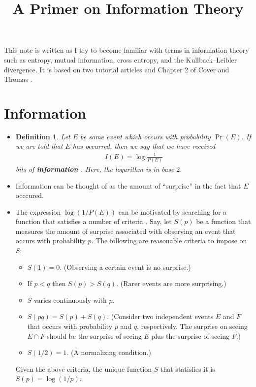 \documentclass[10pt]{article}
\title{A Primer on Information Theory}
\newtheorem{definition}[lemma]{Definition}
\begin{document}
  \maketitle

  This note is written as I try to become familiar with terms in information theory such as entropy, mutual information, cross entropy, and the Kullback--Leibler divergence. It is based on two tutorial articles \cite{Rosenfeld:2018, Galvin:2014} and Chapter 2 of Cover and Thomas \cite{Cover:1991}.

  \section{Information}

  \begin{itemize}
  	\item 
  	\begin{definition}
  	Let $E$ be some event which occurs with probability $\Pr(E)$. If we are told that $E$ has occurred, then we say that we have received
  	\begin{align*}
  		I(E) = \log \frac{1}{P(E)}
  	\end{align*}
  	bits of \textbf{information} \cite{Abramson:1963}. Here, the logarithm is in base $2$.	
  	\end{definition}  

  	\item Information can be thought of as the amount of ``surprise'' in the fact that $E$ occcured.

  	\item The expression $\log (1/P(E))$ can be motivated by searching for a function that satisfies a number of criteria \cite{Galvin:2014}. Say, let $S(p)$ be a function that measures the amount of surprise associated with observing an event that occurs with probability $p$. The following are reasonable criteria to impose on $S$:
  	\begin{itemize}
  		\item $S(1) = 0$. (Observing a certain event is no surprise.)
  		\item If $p < q$ then $S(p) > S(q)$. (Rarer events are more surprising.)
  		\item $S$ varies continuously with $p$.
  		\item $S(pq) = S(p) + S(q)$. (Consider two independent events $E$ and $F$ that occurs with probability $p$ and $q$, respectively. The surprise on seeing $E \cap F$ should be the surprise of seeing $E$ plus the surprise of seeing $F$.)
  		\item $S(1/2) = 1.$ (A normalizing condition.)
  	\end{itemize}
  	Given the above criteria, the unique function $S$ that statisfies it is $S(p) = \log(1/p)$.
  \end{itemize}
\end{document}
